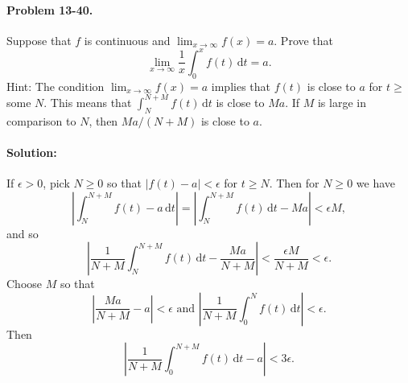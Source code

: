 \documentclass{article}
\begin{document}
\paragraph{Problem 13-40.} Suppose that $f$ is continuous and $\lim_{x
\rightarrow \infty} f(x) = a$. Prove that \begin{equation*}
  \lim_{x \rightarrow \infty} \frac{1}{x}\int_0^x f(t) \,\mathrm{d}t = a.
\end{equation*} Hint: The condition $\lim_{x \rightarrow \infty} f(x) = a$
implies that $f(t)$ is close to $a$ for $t \geq$ some $N$. This means
that $\int_N^{N + M} f(t) \,\mathrm{d}t$ is close to $Ma$. If $M$ is large in
comparison to $N$, then $Ma/(N + M)$ is close to $a$.

\paragraph{Solution:} If $\epsilon > 0$, pick $N \geq 0$ so that $|f(t) - a| <
\epsilon$ for $t \geq N$. Then for $N \geq 0$ we have \begin{equation*}
  \left|\int_N^{N + M} f(t) - a \,\mathrm{d}t\right|
    = \left|\int_N^{N + M} f(t) \,\mathrm{d}t - Ma\right| < \epsilon M,
\end{equation*} and so \begin{equation*}
  \left|\frac{1}{N + M}\int_N^{N + M} f(t) \,\mathrm{d}t
    - \frac{Ma}{N + M}\right| < \frac{\epsilon M}{N + M} < \epsilon.
\end{equation*} Choose $M$ so that \begin{equation*}
  \left|\frac{Ma}{N + M} - a\right| < \epsilon \text{ and }
    \left|\frac{1}{N + M}\int_0^N f(t) \,\mathrm{d}t\right| < \epsilon.
\end{equation*} Then \begin{equation*}
    \left|\frac{1}{N + M}\int_0^{N + M} f(t) \,\mathrm{d}t - a\right|
    < 3\epsilon.
\end{equation*}
\end{document}
